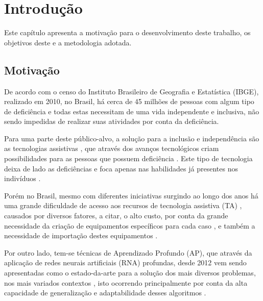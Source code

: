 \chapter[Introdução]{Introdução}

Este capítulo apresenta a motivação para o desenvolvimento deste trabalho, os objetivos deste e a metodologia adotada.

\section{Motivação} %

\par De acordo com o censo do Instituto Brasileiro de Geografia e Estatística (IBGE), realizado em 2010, no Brasil, há cerca de 45 milhões de pessoas com algum tipo de deficiência e todas estas necessitam de uma vida independente e inclusiva, não sendo impedidas de realizar suas atividades por conta da deficiência.

\par Para uma parte deste público-alvo, a solução para a inclusão e independência são as tecnologias assistivas \cite{ANDRIOLI2017}, que através dos avanços tecnológicos criam possibilidades para as pessoas que possuem deficiência \cite{Bersch2017}. Este tipo de tecnologia deixa de lado as deficiências e foca apenas nas habilidades já presentes nos indivíduos \cite{tve2016}.

\par Porém no Brasil, mesmo com diferentes iniciativas surgindo ao longo dos anos \cite{Bersch2017} há uma grande dificuldade de acesso aos recursos de tecnologia assistiva (TA) \cite{ANDRIOLI2017}, causados por diversos fatores, a citar, o alto custo, por conta da grande necessidade da criação de equipamentos específicos para cada caso \cite{tve2016}, e também a necessidade de importação destes equipamentos \cite{ANDRIOLI2017}.

\par Por outro lado, tem-se técnicas de Aprendizado Profundo (AP), que através da aplicação de redes neurais artificiais (RNA) profundas, desde 2012 vem sendo apresentadas como o estado-da-arte para a solução dos mais diversos problemas, nos mais variados contextos \cite{Ponti2018, forbes2019}, isto ocorrendo principalmente por conta da alta capacidade de generalização e adaptabilidade desses algoritmos \cite{Camila2017, Ponti2018, forbes2019}.

